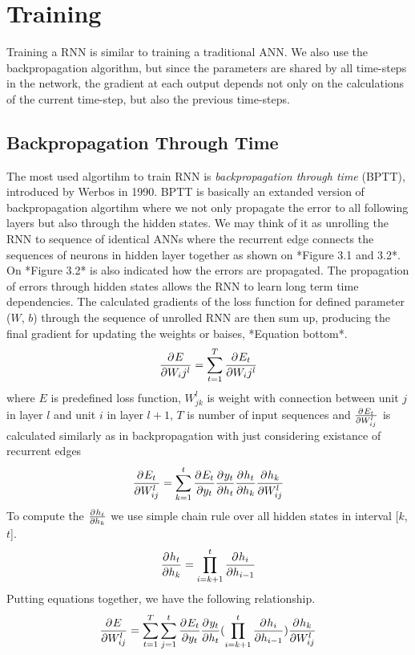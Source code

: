 \section{Training}

Training a RNN is similar to training a traditional ANN.
We also use the backpropagation algorithm, but since the parameters are shared by all time-steps in the network, the gradient at each output depends not only on the calculations of the current time-step, but also the previous time-steps.






\subsection{Backpropagation Through Time}
The most used algortihm to train RNN is \textit{backpropagation through time} (BPTT), introduced by Werbos in 1990.
BPTT is basically an extanded version of backpropagation algortihm where we not only propagate the error to all following layers but also through the hidden states.
We may think of it as unrolling the RNN to sequence of identical ANNs where the recurrent edge connects the sequences of neurons in hidden layer together as shown on *Figure 3.1 and 3.2*.
On *Figure 3.2* is also indicated how the errors are propagated.
The propagation of errors through hidden states allows the RNN to learn long term time dependencies.
The calculated gradients of the loss function for defined parameter ($W$, $b$) through the sequence of unrolled RNN are then sum up, producing the final gradient for updating the weights or baises, *Equation bottom*.
\[ \frac{\partial^{} E}{\partial W_ij^l} = \sum_{t=1}^{T}\frac{\partial^{} E_t}{\partial W_ij^l} \]
where $E$ is predefined loss function, ${W_{jk}^l}$ is weight with connection between unit $j$ in layer $l$ and unit $i$ in layer $l+1$, $T$ is number of input sequences and $\frac{\partial^{} E_t}{\partial W_{ij}^l}$ is calculated similarly as in backpropagation with just considering existance of recurrent edges
\[ \frac{\partial^{} E_t}{\partial W_{ij}^l} = \sum_{k=1}^{t}\frac{\partial^{} E_t}{\partial y_t}\frac{\partial^{} y_t}{\partial h_t}\frac{\partial^{} h_t}{\partial h_k}\frac{\partial^{} h_k}{\partial W_{ij}^l} \]
To compute the $\frac{\partial^{} h_t}{\partial h_k}$ we use simple chain rule over all hidden states in interval [$k$,$t$].
\[ \frac{\partial^{} h_t}{\partial h_k} = \prod_{i=k+1}^{t}\frac{\partial^{} h_i}{\partial h_{i-1}} \]
Putting equations together, we have the following relationship.
\[  \frac{\partial^{} E}{\partial W_{ij}^l} = \sum_{t=1}^{T}\sum_{j=1}^{t}\frac{\partial^{} E_t}{\partial y_t}\frac{\partial^{} y_t}{\partial h_t}(\prod_{i=k+1}^{t}\frac{\partial^{} h_i}{\partial h_{i-1}})\frac{\partial^{} h_k}{\partial W_{ij}^l} \]

